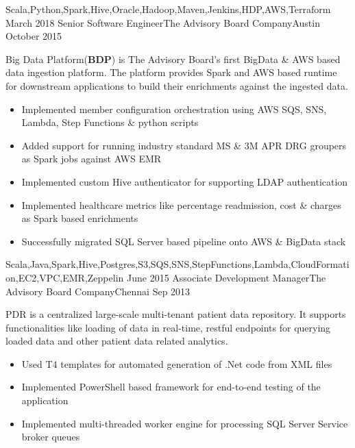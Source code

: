 \begin{experiences}
{\begin{itemize}
                      \end{itemize}
                    }
                    {Scala,Python,Spark,Hive,Oracle,Hadoop,Maven,Jenkins,HDP,AWS,Terraform}
  \emptySeparator
  \experience
    {March 2018} {Senior Software Engineer}{The Advisory Board Company}{Austin}
    {October 2015}    
    			 {
    	              Big Data Platform(\textbf{BDP}) is The Advisory Board's first BigData \& AWS based data ingestion platform. The platform provides Spark and AWS based runtime for downstream applications to build their enrichments against the ingested data. 
    	              \begin{itemize}
    	              	\item Implemented member configuration orchestration using AWS SQS, SNS, Lambda, Step Functions \& python scripts                           
    	              	\item Added support for running industry standard MS \& 3M APR DRG groupers as Spark jobs against AWS EMR                        
    	              	\item Implemented custom Hive authenticator for supporting LDAP  authentication  
    	              	\item Implemented healthcare metrics like percentage readmission, cost \& charges as Spark based enrichments                
    	              	\item Successfully migrated SQL Server based pipeline onto AWS \& BigData stack
    	              \end{itemize}
                  }
              {Scala,Java,Spark,Hive,Postgres,S3,SQS,SNS,StepFunctions,Lambda,CloudFormation,EC2,VPC,EMR,Zeppelin}
  \emptySeparator
  \experience
    {June 2015}     {Associate Development Manager}{The Advisory Board Company}{Chennai}
    {Sep 2013}    {
    	              PDR is a centralized large-scale multi-tenant patient data repository. It supports functionalities like loading of data in real-time, restful endpoints for querying loaded data and other patient data related analytics.
                      \begin{itemize}
                        \item Used T4 templates for automated generation of .Net code from XML files
                        \item Implemented PowerShell based framework for end-to-end testing of the application
                        \item Implemented multi-threaded worker engine for processing SQL Server Service broker queues

\end{itemize}}
\end{experiences}
